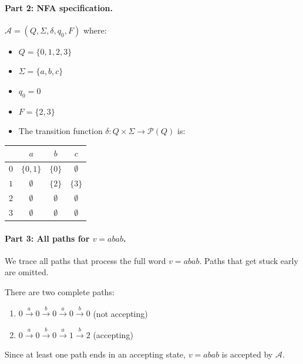 \documentclass{article}
\theoremstyle{theorem}
\theoremstyle{definition}
\theoremstyle{remark}
\begin{document}
\paragraph{Part 2: NFA specification.}
$\mathcal{A} = (Q, \Sigma, \delta, q_0, F)$ where:
\begin{itemize}
  \item $Q = \{0, 1, 2, 3\}$
  \item $\Sigma = \{a, b, c\}$
  \item $q_0 = 0$
  \item $F = \{2, 3\}$
  \item The transition function $\delta \colon Q \times \Sigma \to \mathcal{P}(Q)$ is:
\end{itemize}
\begin{center}
\begin{tabular}{c|ccc}
 & $a$ & $b$ & $c$ \\ \hline
$0$ & $\{0,1\}$ & $\{0\}$ & $\emptyset$ \\
$1$ & $\emptyset$ & $\{2\}$ & $\{3\}$ \\
$2$ & $\emptyset$ & $\emptyset$ & $\emptyset$ \\
$3$ & $\emptyset$ & $\emptyset$ & $\emptyset$ \\
\end{tabular}
\end{center}

\paragraph{Part 3: All paths for $v = abab$.}
We trace all paths that process the full word $v = abab$. Paths that get stuck early are omitted.

\begin{center}
\end{center}

There are two complete paths:
\begin{enumerate}
  \item $0 \xrightarrow{a} 0 \xrightarrow{b} 0 \xrightarrow{a} 0 \xrightarrow{b} 0$ \quad (not accepting)
  \item $0 \xrightarrow{a} 0 \xrightarrow{b} 0 \xrightarrow{a} 1 \xrightarrow{b} 2$ \quad (accepting)
\end{enumerate}
Since at least one path ends in an accepting state, $v = abab$ is accepted by $\mathcal{A}$.
\end{document}
